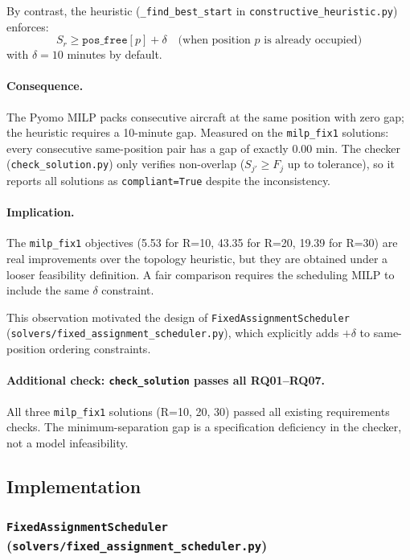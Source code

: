 By contrast, the heuristic (\texttt{\_find\_best\_start} in
\texttt{constructive\_heuristic.py}) enforces:
\[
    S_r \geq \mathtt{pos\_free}[p] + \delta
    \quad \text{(when position } p \text{ is already occupied)}
\]
with $\delta = 10$ minutes by default.

\paragraph{Consequence.}

The Pyomo MILP packs consecutive aircraft at the same position with zero gap;
the heuristic requires a 10-minute gap.  Measured on the \texttt{milp\_fix1}
solutions: every consecutive same-position pair has a gap of exactly 0.00 min.
The checker (\texttt{check\_solution.py}) only verifies non-overlap ($S_{j'} \geq F_j$
up to tolerance), so it reports all solutions as \texttt{compliant=True} despite
the inconsistency.

\paragraph{Implication.}

The \texttt{milp\_fix1} objectives (5.53 for R=10, 43.35 for R=20, 19.39 for
R=30) are real improvements over the topology heuristic, but they are obtained
under a looser feasibility definition.  A fair comparison requires the
scheduling MILP to include the same $\delta$ constraint.

This observation motivated the design of \texttt{FixedAssignmentScheduler}
(\texttt{solvers/fixed\_assignment\_scheduler.py}), which explicitly adds
$+\delta$ to same-position ordering constraints.

\paragraph{Additional check: \texttt{check\_solution} passes all RQ01--RQ07.}

All three \texttt{milp\_fix1} solutions (R=10, 20, 30) passed all existing
requirements checks.  The minimum-separation gap is a specification deficiency
in the checker, not a model infeasibility.

\subsection{Implementation}

\subsubsection{\texttt{FixedAssignmentScheduler} (\texttt{solvers/fixed\_assignment\_scheduler.py})}

